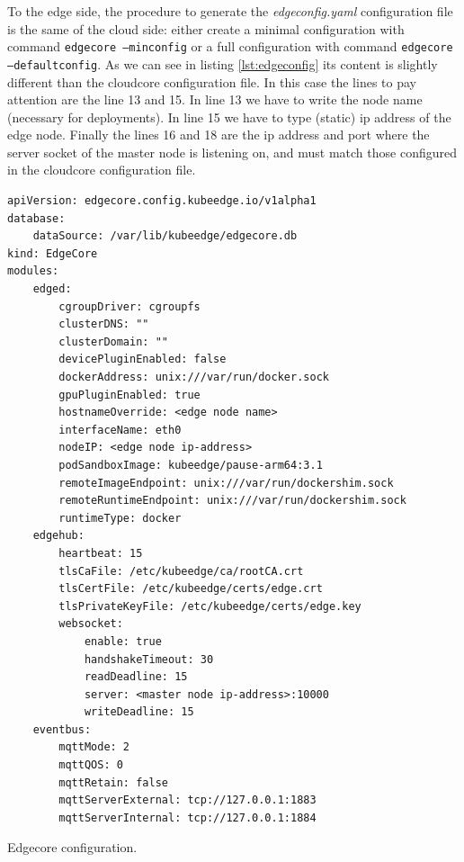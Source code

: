To the edge side, the procedure to generate the \textit{edgeconfig.yaml} configuration file is the same of the cloud side: either create a minimal configuration with command \texttt{edgecore --minconfig} or a full configuration with command \texttt{edgecore --defaultconfig}. As we can see in listing \ref{lst:edgeconfig} its content is slightly different than the cloudcore configuration file.
In this case the lines to pay attention are the line 13 and 15. In line 13 we have to write the node name (necessary for deployments). In line 15 we have to type (static) ip address of the edge node. Finally the lines 16 and 18 are the ip address and port where the server socket of the master node is listening on, and must match those configured in the cloudcore configuration file.

\begin{listing}[H]
\begin{verbatim}
apiVersion: edgecore.config.kubeedge.io/v1alpha1
database:
    dataSource: /var/lib/kubeedge/edgecore.db
kind: EdgeCore
modules:
    edged:
        cgroupDriver: cgroupfs
        clusterDNS: ""
        clusterDomain: ""
        devicePluginEnabled: false
        dockerAddress: unix:///var/run/docker.sock
        gpuPluginEnabled: true
        hostnameOverride: <edge node name>
        interfaceName: eth0
        nodeIP: <edge node ip-address>
        podSandboxImage: kubeedge/pause-arm64:3.1
        remoteImageEndpoint: unix:///var/run/dockershim.sock
        remoteRuntimeEndpoint: unix:///var/run/dockershim.sock
        runtimeType: docker
    edgehub:
        heartbeat: 15
        tlsCaFile: /etc/kubeedge/ca/rootCA.crt
        tlsCertFile: /etc/kubeedge/certs/edge.crt
        tlsPrivateKeyFile: /etc/kubeedge/certs/edge.key
        websocket:
            enable: true
            handshakeTimeout: 30
            readDeadline: 15
            server: <master node ip-address>:10000
            writeDeadline: 15
    eventbus:
        mqttMode: 2
        mqttQOS: 0
        mqttRetain: false
        mqttServerExternal: tcp://127.0.0.1:1883
        mqttServerInternal: tcp://127.0.0.1:1884
\end{verbatim}
\caption{Edgecore configuration.}
\label{lst:edgeconfig}
\end{listing}

